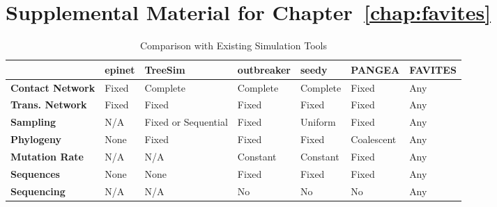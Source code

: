 \chapter{Supplemental Material for Chapter~\ref{chap:favites}}
\label{chap:favites-sup}
\clearpage

\begin{table}[!ht]
\caption[Comparison with Existing Simulation Tools]{Comparison with Existing Simulation Tools}
\vspace{-0.25in}
\begin{center}
\begin{tabular}{|P{0.8in}|P{0.5in}|P{0.8in}|P{0.8in}|P{0.6in}|P{0.8in}|P{0.8in}|}
\hline
 & \textbf{epinet} & \textbf{TreeSim} & \textbf{outbreaker} & \textbf{seedy} & \textbf{PANGEA} & \textbf{FAVITES} \\
\hline
\textbf{Contact Network} & Fixed & Complete & Complete & Complete & Fixed & Any \\
\hline
\textbf{Trans. Network} & Fixed & Fixed & Fixed & Fixed & Fixed & Any\\
\hline
\textbf{Sampling} & N/A & Fixed or \newline Sequential & Fixed & Uniform & Fixed & Any \\
\hline
\textbf{Phylogeny} & None & Fixed & Fixed & Fixed & Coalescent & Any \\
\hline
\textbf{Mutation Rate} & N/A & N/A & Constant & Constant & Fixed & Any \\
\hline
\textbf{Sequences} & None & None & Fixed & Fixed & Fixed & Any \\
\hline
\textbf{Sequencing} & N/A & N/A & No & No & No & Any \\
\hline
\end{tabular}
\end{center}
\label{tab:favites-comparison}
\end{table}

